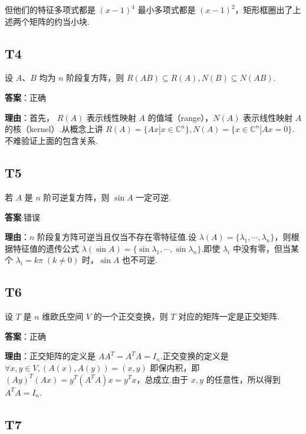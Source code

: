 \documentclass{article}
\begin{document}
但他们的特征多项式都是 $(x-1)^4$ 最小多项式都是 $(x-1)^2$，矩形框圈出了上述两个矩阵的约当小块.

\subsection{T4}

\par 设 $A、B$ 均为 $n$ 阶段复方阵，则 $R(AB)\subseteq R(A), N(B)\subseteq N(AB)$.

\par \textbf{答案}：正确

\par \textbf{理由}：首先， $R(A)$ 表示线性映射 $A$ 的值域（range），$N(A)$ 表示线性映射 $A$ 的核（kernel）.从概念上讲 $R(A)=\{Ax | x\in \mathbb C^n\}, N(A)=\{x\in \mathbb C^n|Ax=0\}$.不难验证上面的包含关系.

\subsection{T5}

\par 若 $A$ 是 $n$ 阶可逆复方阵，则 $\sin A$ 一定可逆.

\par \textbf{答案}:错误

\par \textbf{理由}：$n$ 阶段复方阵可逆当且仅当不存在零特征值.设 $\lambda(A)=\{\lambda_1, \cdots, \lambda_n\}$，则根据特征值的遗传公式 $\lambda(\sin A)=\{\sin \lambda_1, \cdots, \sin \lambda_n\}$.即使 $\lambda_i$ 中没有零，但当某个 $\lambda_i=k\pi\;(k\neq 0)$ 时，$\sin A$ 也不可逆.

\subsection{T6}

\par 设 $T$ 是 $n$ 维欧氏空间 $V$ 的一个正交变换，则 $T$ 对应的矩阵一定是正交矩阵.

\par \textbf{答案}：正确

\par \textbf{理由}：正交矩阵的定义是 $AA^T=A^TA=I_n$.正交变换的定义是 $\forall x, y\in V, (A(x), A(y))=(x, y)$ 即保内积，即 $(Ay)^T(Ax)=y^T(A^TA)x=y^Tx$，总成立.由于 $x, y$ 的任意性，所以得到 $A^TA=I_n$.

\subsection{T7}
\end{document}
